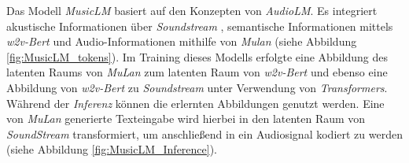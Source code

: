\documentclass[
  a4paper,  %
  twoside,  %
  bibliography=totoc,
  headsepline,
  cleardoublepage=empty,
  parskip=half,
  draft=false
]{scrbook}
\begin{document}
Das Modell \emph{MusicLM} \cite{agostinelli_musiclm_2023} basiert auf den Konzepten von \emph{AudioLM}. Es integriert akustische Informationen über \emph{Soundstream} \cite{zeghidour_soundstream_2021}, semantische Informationen mittels \emph{w2v-Bert} \cite{chung_w2v-bert_2021-1} und Audio-Informationen mithilfe von \emph{Mulan} \cite{huang_mulan_2022} (siehe Abbildung \ref{fig:MusicLM_tokens}). Im Training dieses Modells erfolgte eine Abbildung des latenten Raums von \emph{MuLan} zum latenten Raum von \emph{w2v-Bert} und ebenso eine Abbildung von \emph{w2v-Bert} zu \emph{Soundstream} unter Verwendung von \emph{Transformers}. Während der \emph{Inferenz} können die erlernten Abbildungen genutzt werden. Eine von \emph{MuLan} generierte Texteingabe wird hierbei in den latenten Raum von \emph{SoundStream} transformiert, um anschließend in ein Audiosignal kodiert zu werden (siehe Abbildung \ref{fig:MusicLM_Inference}). \cite{agostinelli_musiclm_2023}
\end{document}
